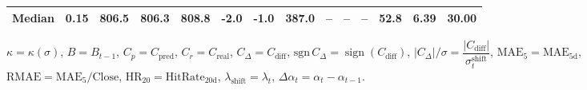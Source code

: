 \begin{threeparttable}
{\begin{tabular}{lrrrrrrrrrrrrr}
 Median &     0.15 & 806.5 &  806.3 & 808.8 &       -2.0 &                     -1.0 &               387.0 &         -- &        -- &             -- &             52.8 &            6.39 &                  30.00 \\
\bottomrule
\end{tabular}
}%
\begin{tablenotes}\footnotesize
\item $\kappa=\kappa(\sigma)$, $B=B_{t-1}$, $C_p=C_{\text{pred}}$, $C_r=C_{\text{real}}$, $C_\Delta=C_{\text{diff}}$, $\mathrm{sgn}\,C_\Delta=\operatorname{sign}(C_{\text{diff}})$, $|C_\Delta|/\sigma=\dfrac{|C_{\text{diff}}|}{\sigma_t^{\text{shift}}}$, $\mathrm{MAE}_5=\mathrm{MAE}_{5\text{d}}$, $\mathrm{RMAE}= \mathrm{MAE}_5 / \text{Close}$, $\mathrm{HR}_{20}=\mathrm{HitRate}_{20\text{d}}$, 
$\lambda_{\text{shift}}=\lambda_t$, 
$\Delta\alpha_t=\alpha_t-\alpha_{t-1}$.
\end{tablenotes}
\end{threeparttable}
\endgroup